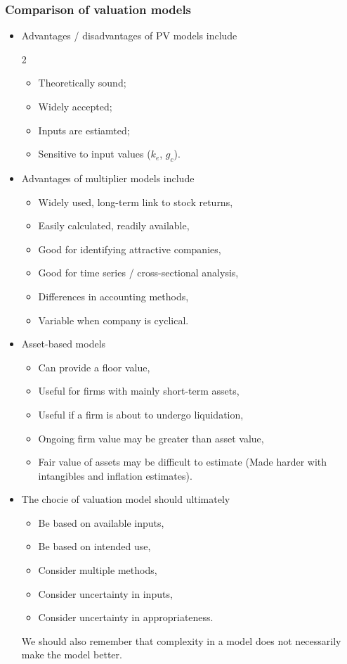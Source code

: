 \documentclass[../notes_compiled.tex]{subfiles}
\begin{document}
\subsubsection{Comparison of valuation models}
\begin{itemize}
\item Advantages / disadvantages of PV models include
\begin{multicols}{2}
\begin{itemize}
\item[+] Theoretically sound;
\item[+] Widely accepted;
\item Inputs are estiamted;
\item Sensitive to input values ($k_{e}$, $g_{c}$).
\end{itemize}
\end{multicols}
\item Advantages of multiplier models include
\begin{itemize}
\item[+] Widely used, long-term link to stock returns,
\item[+] Easily calculated, readily available,
\item[+] Good for identifying attractive companies,
\item[+] Good for time series / cross-sectional analysis,
\item Differences in accounting methods,
\item Variable when company is cyclical.
\end{itemize}
\item Asset-based models
\begin{itemize}
\item[+] Can provide a floor value,
\item[+] Useful for firms with mainly short-term assets,
\item[+] Useful if a firm is about to undergo liquidation,
\item Ongoing firm value may be greater than asset value,
\item Fair value of assets may be difficult to estimate (Made harder with intangibles and inflation estimates).
\end{itemize}
\item The chocie of valuation model should ultimately
\begin{itemize}
\item Be based on available inputs,
\item Be based on intended use,
\item Consider multiple methods,
\item Consider uncertainty in inputs,
\item Consider uncertainty in appropriateness.
\end{itemize}
We should also remember that complexity in a model does not necessarily make the model better.
\end{itemize}
\end{document}
